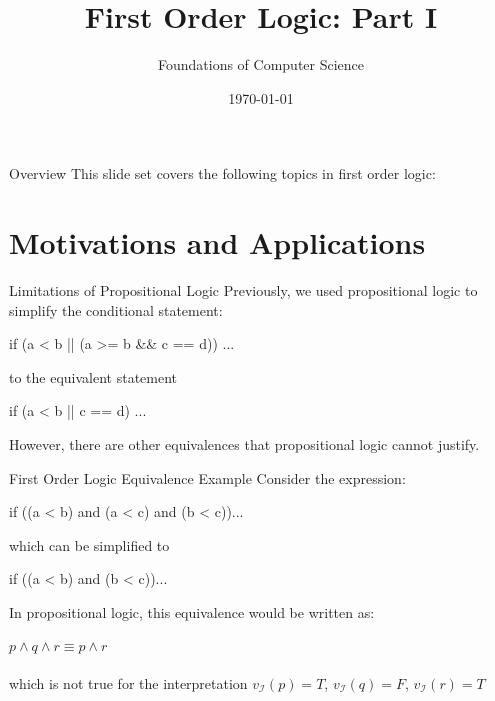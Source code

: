 \documentclass[style=sailor,size=12pt]{powerdot}
\title{First Order Logic: Part I}
\author{Foundations of Computer Science}
\date{\today}
\begin{document}
\maketitle
\begin{slide}[toc=,bm=]{Overview}
This slide set covers the following topics in first order logic:

\vspace{10mm}
\tableofcontents[content=sections]
\end{slide}

\section[slide=true]{Motivations and Applications}
\begin{wideslide}[bm=,toc=]{Limitations of Propositional Logic}
Previously, we used propositional logic to simplify the conditional statement:
\begin{program}
if (a < b || (a >= b \&\& c == d)) ...
\end{program}
\pause 
to the equivalent statement
\vspace{-1em}
\begin{program}
if (a < b || c == d) ...
\end{program}
\pause
However, there are other equivalences that propositional logic cannot justify.
\end{wideslide}

\begin{wideslide}[bm=,toc=]{First Order Logic Equivalence Example}
Consider the expression:
\begin{program}
if ((a < b) and (a < c) and (b < c))...
\end{program}
\pause
which can be simplified to
\vspace{-1em}
\begin{program}
if ((a < b) and (b < c))...
\end{program}
\vspace{-1em}
\pause
In propositional logic, this equivalence would be written as:\\~\\
$p \land q \land r \equiv p \land r$\\~\\
\pause
which is not true for the interpretation $v_{\mathcal{I}}(p) = T$,
   $v_{\mathcal{I}}(q) = F$, $v_{\mathcal{I}}(r) = T$
\end{wideslide}
\end{document}
